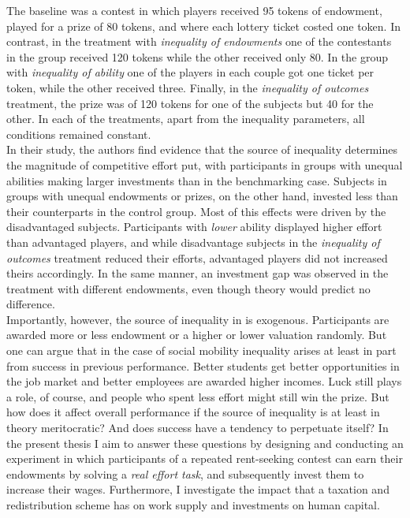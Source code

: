 The baseline was a contest in which players received 95 tokens of endowment, played for a prize of 80 tokens, and where each lottery ticket costed one token. In contrast, in the treatment with \textit{inequality of endowments} one of the contestants in the group received 120 tokens while the other received only 80. In the group with \textit{inequality of ability} one of the players in each couple got one ticket per token, while the other received three. Finally, in the \textit{inequality of outcomes} treatment, the prize was of 120 tokens for one of the subjects but 40 for the other. In each of the treatments, apart from the inequality parameters, all conditions remained constant.\\

In their study, the authors find evidence that the source of inequality determines the magnitude of competitive effort put, with participants in groups with unequal abilities making larger investments than in the benchmarking case. Subjects in groups with unequal endowments or prizes, on the other hand, invested less than their counterparts in the control group. Most of this effects were driven by the disadvantaged subjects. Participants with \textit{lower} ability displayed higher effort than advantaged players, and while disadvantage subjects in the \textit{inequality of outcomes} treatment reduced their efforts, advantaged players did not increased theirs accordingly. In the same manner, an investment gap was observed in the treatment with different endowments, even though theory would predict no difference.\\

Importantly, however, the source of inequality in \cite{fallucchi2017} is exogenous. Participants are awarded more or less endowment or a higher or lower valuation randomly. But one can argue that in the case of social mobility inequality arises at least in part from success in previous performance. Better students get better opportunities in the job market and better employees are awarded higher incomes. Luck still plays a role, of course, and people who spent less effort might still win the prize. But how does it affect overall performance if the source of inequality is at least in theory meritocratic? And does success have a tendency to perpetuate itself? In the present thesis I aim to answer these questions by designing and conducting an experiment in which participants of a repeated rent-seeking contest can earn their endowments by solving a \textit{real effort task}, and subsequently invest them to increase their wages. Furthermore, I investigate the impact that a taxation and redistribution scheme has on work supply and investments on human capital.\\

